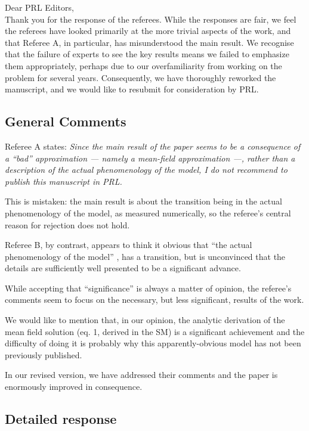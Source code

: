 \documentclass[a4paper,10pt]{article}
\title{}
\author{Joshua DM Hellier and Graeme J Ackland}
\begin{document}
\maketitle

 Dear PRL Editors, \\ 

 Thank you for the response of the referees. While the responses are
fair, we feel the referees have looked primarily at the more trivial
aspects of the work, and that Referee A, in particular, has misunderstood the
main result. We recognise that the failure of experts to see the key
results means we failed to emphasize them appropriately, perhaps due
to our overfamiliarity from working on the problem for several
years. Consequently, we have thoroughly reworked the manuscript, and
we would like to resubmit for consideration by PRL.

\subsection*{General Comments}
  Referee A states:
{\it  Since the main result of the paper seems to be a consequence of a ``bad'' approximation --- namely a mean-field approximation ---, rather than a description of the actual phenomenology of the model, I do not recommend to publish this manuscript in PRL.}

  This is mistaken: the main result is about the transition being in the actual phenomenology of the model, as measured numerically, so the referee's central reason for rejection does not hold.
 
  Referee B, by contrast, appears to think it obvious that ``the actual phenomenology of the model'' , has a transition, but is unconvinced that the details are sufficiently well presented to be a significant advance.

 While accepting that ``significance'' is always a matter of opinion,
 the referee's comments seem to focus on the necessary, but less
 significant, results of the work.
 
We would like to mention that, in our opinion, the analytic derivation
of the mean field solution (eq. 1, derived in the SM) is a significant
achievement and the difficulty of doing it is probably why this
apparently-obvious model has not been previously published.


In our revised version, we have addressed their comments and the paper is enormously improved in consequence.
 
 
\subsection*{Detailed response}
\end{document}
